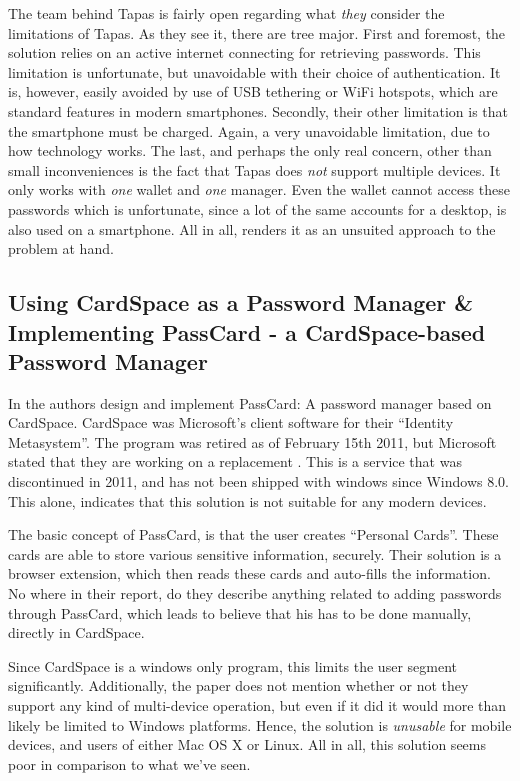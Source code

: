 			The team behind Tapas is fairly open regarding what \emph{they} consider the limitations of Tapas. As they see it, there are tree major. First and foremost, the solution relies on an active internet connecting for retrieving passwords. This limitation is unfortunate, but unavoidable with their choice of authentication. It is, however, easily avoided by use of USB tethering or WiFi hotspots, which are standard features in modern smartphones. Secondly, their other limitation is that the smartphone must be charged. Again, a very unavoidable limitation, due to how technology works. The last, and perhaps the only real concern, other than small inconveniences is the fact that Tapas does \emph{not} support multiple devices. It only works with \emph{one} wallet and  \emph{one} manager. Even the wallet cannot access these passwords which is unfortunate, since a lot of the same accounts for a desktop, is also used on a smartphone. All in all, renders it as an unsuited approach to the problem at hand.


		\subsection*{Using CardSpace as a Password Manager \& Implementing PassCard - a CardSpace-based Password Manager}
			In \cite{cardspace,cardspace_impl} the authors design and implement PassCard: A password manager based on CardSpace. CardSpace was Microsoft's client software for their ``Identity Metasystem''. The program was retired as of February 15th 2011, but Microsoft stated that they are working on a replacement \cite{cardspace_cancelled}. This is a service that was discontinued in 2011, and has not been shipped with windows since Windows 8.0. This alone, indicates that this solution is not suitable for any modern devices.

			The basic concept of PassCard, is that the user creates ``Personal Cards''. These cards are able to store various sensitive information, securely. Their solution is a browser extension, which then reads these cards and auto-fills the information. No where in their report, do they describe anything related to adding passwords through PassCard, which leads to believe that his has to be done manually, directly in CardSpace.

			Since CardSpace is a windows only program, this limits the user segment significantly. Additionally, the paper does not mention whether or not they support any kind of multi-device operation, but even if it did it would more than likely be limited to Windows platforms. Hence, the solution is \emph{unusable} for mobile devices, and users of either Mac OS X or Linux. All in all, this solution seems poor in comparison to what we've seen.

